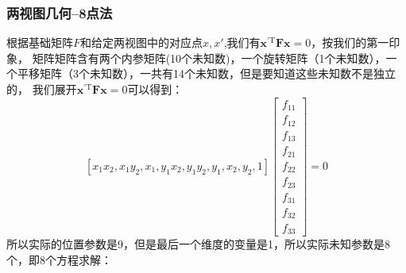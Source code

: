 \documentclass[12pt]{article}
\begin{document}
\subsubsection{两视图几何--8点法}
根据基础矩阵$F$和给定两视图中的对应点$x,x'$,我们有$\mathbf{x}^{\prime \mathrm{T}} \mathbf{F} \mathbf{x}=0$，按我们的第一印象，
矩阵矩阵含有两个内参矩阵(10个未知数)，一个旋转矩阵（1个未知数），一个平移矩阵（3个未知数），一共有14个未知数，但是要知道这些未知数不是独立的，
我们展开$\mathbf{x}^{\prime \mathrm{T}} \mathbf{F} \mathbf{x}=0$可以得到：
\begin{equation}
    \left[x_{1} x_{2}, x_{1} y_{2}, x_{1}, y_{1} x_{2}, y_{1} y_{2}, y_{1}, x_{2}, y_{2}, 1\right]\left[\begin{array}{c}
        f_{11} \\
        f_{12} \\
        f_{13} \\
        f_{21} \\
        f_{22} \\
        f_{23} \\
        f_{31} \\
        f_{32} \\
        f_{33}
        \end{array}\right]=0
\end{equation}
所以实际的位置参数是9，但是最后一个维度的变量是1，所以实际未知参数是8个，即8个方程求解：
\end{document}

